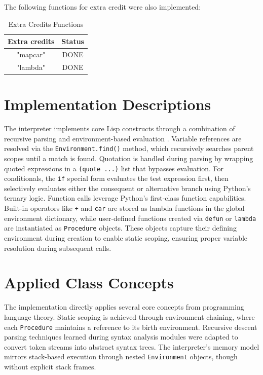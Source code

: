 \documentclass[sigconf]{acmart}
\begin{document}
The following functions for extra credit were also implemented:
\begin{table}[h!]
    \begin{tabular}{| c | c|}
        \hline
        Extra credits & Status \\
        \hline
        "mapcar" & DONE \\
        "lambda" & DONE \\
        \hline
    \end{tabular}
    \label{tab:extrafunctions}
    \caption{Extra Credits Functions}
\end{table}

\section{Implementation Descriptions}
The interpreter implements core Lisp constructs through a combination of recursive parsing and environment-based evaluation \cite{lispy}\cite{pythondoc}. Variable references are resolved via the \texttt{Environment.find()} method, which recursively searches parent scopes until a match is found. Quotation is handled during parsing by wrapping quoted expressions in a \texttt{(quote ...)} list that bypasses evaluation. For conditionals, the \texttt{if} special form evaluates the test expression first, then selectively evaluates either the consequent or alternative branch using Python's ternary logic.
Function calls leverage Python's first-class function capabilities. Built-in operators like \texttt{+} and \texttt{car} are stored as lambda functions in the global environment dictionary, while user-defined functions created via \texttt{defun} or \texttt{lambda} are instantiated as \texttt{Procedure} objects. These objects capture their defining environment during creation to enable static scoping, ensuring proper variable resolution during subsequent calls.
\section{Applied Class Concepts}
The implementation directly applies several core concepts from programming language theory. Static scoping is achieved through environment chaining, where each \texttt{Procedure} maintains a reference to its birth environment. Recursive descent parsing techniques learned during syntax analysis modules were adapted to convert token streams into abstract syntax trees. The interpreter's memory model mirrors stack-based execution through nested \texttt{Environment} objects, though without explicit stack frames.
\end{document}
